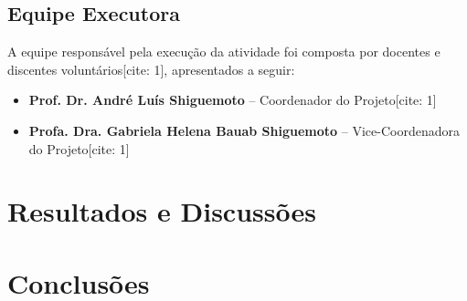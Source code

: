 \documentclass[12pt, a4paper]{article}
\begin{document}
\subsection{Equipe Executora}
A equipe responsável pela execução da atividade foi composta por docentes e discentes voluntários[cite: 1], apresentados a seguir:


\begin{itemize}[leftmargin=*]
    \item \textbf{Prof. Dr. André Luís Shiguemoto} -- Coordenador do Projeto[cite: 1]
    \item \textbf{Profa. Dra. Gabriela Helena Bauab Shiguemoto} -- Vice-Coordenadora do Projeto[cite: 1]
    
\end{itemize}


\section{Resultados e Discussões}

\section{Conclusões}
\end{document}
